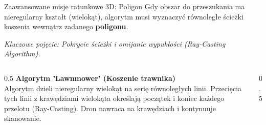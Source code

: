 \begin{frame}{Zaawansowane misje ratunkowe 3D: Poligon}
    Gdy obszar do przeszukania ma nieregularny kształt (wielokąt), algorytm musi wyznaczyć równoległe ścieżki koszenia wewnątrz zadanego \textbf{poligonu}.
    
    \vspace{0.3cm}
    \textit{Kluczowe pojęcie: Pokrycie ścieżki i omijanie wypukłości (Ray-Casting Algorithm).}
    
    \begin{columns}
        \begin{column}{0.5\textwidth}
            \small
            \textbf{Algorytm 'Lawnmower' (Koszenie trawnika)} \\
            Algorytm dzieli nieregularny wielokąt na serię równoległych linii. 
            Przecięcia tych linii z krawędziami wielokąta określają początek i koniec każdego przelotu (Ray-Casting). 
            Dron nawraca na krawędziach i kontynuuje skanowanie.
        \end{column}
        \begin{column}{0.5\textwidth}
            \begin{center}
            \end{center}
        \end{column}
    \end{columns}
\end{frame}

